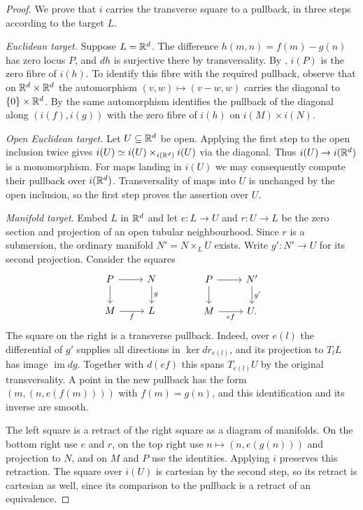 \begin{proof}
  We prove that $i$ carries the transverse square to a pullback, in
  three steps according to the target $L$.

  \emph{Euclidean target.}
  Suppose $L=\mathbb{R}^d$. The difference $h(m,n)=f(m)-g(n)$ has zero locus
  $P$, and $dh$ is surjective there by transversality. By
  , $i(P)$ is the zero fibre of
  $i(h)$. To identify this fibre with the required pullback, observe
  that on $\mathbb{R}^d\times\mathbb{R}^d$ the automorphism $(v,w)\mapsto(v-w,w)$
  carries the diagonal to $\{0\}\times\mathbb{R}^d$. By
   the same automorphism identifies
  the pullback of the diagonal along $(i(f),i(g))$ with the zero fibre
  of $i(h)$ on $i(M)\times i(N)$.

  \emph{Open Euclidean target.}
  Let $U\subseteq\mathbb{R}^d$ be open. Applying the first step to the open
  inclusion twice gives
  $i(U)\simeq i(U)\times_{i(\mathbb{R}^d)}i(U)$ via the diagonal. Thus
  $i(U)\to i(\mathbb{R}^d)$ is a monomorphism. For maps landing in $i(U)$
  we may consequently compute their pullback over $i(\mathbb{R}^d)$.
  Transversality of maps into $U$ is unchanged by the open inclusion,
  so the first step proves the assertion over $U$.

  \emph{Manifold target.}
  Embed $L$ in $\mathbb{R}^d$ and let $e\colon L\to U$ and $r\colon U\to L$
  be the zero section and projection of an open tubular neighbourhood.
  Since $r$ is a submersion, the ordinary manifold $N'=N\times_L U$
  exists. Write $g'\colon N'\to U$ for its second projection. Consider
  the squares
  \[
  \begin{tikzcd}
    P \rar \dar & N \dar["g"] \\
    M \rar["f"'] & L
  \end{tikzcd}
  \qquad\qquad
  \begin{tikzcd}
    P \rar \dar & N' \dar["g'"] \\
    M \rar["ef"'] & U .
  \end{tikzcd}
  \]
  The square on the right is a transverse pullback. Indeed, over
  $e(l)$ the differential of $g'$ supplies all directions in
  $\ker d r_{e(l)}$, and its projection to $T_lL$ has image
  $\operatorname{im}dg$. Together with $d(ef)$ this spans $T_{e(l)}U$
  by the original transversality. A point in the new pullback has
  the form $(m,(n,e(f(m))))$ with $f(m)=g(n)$, and this identification
  and its inverse are smooth.

  The left square is a retract of the right square as a diagram of
  manifolds. On the bottom right use $e$ and $r$, on the top right use
  $n\mapsto(n,e(g(n)))$ and projection to $N$, and on $M$ and $P$ use
  the identities. Applying $i$ preserves this retraction. The square
  over $i(U)$ is cartesian by the second step, so its retract is
  cartesian as well, since its comparison to the pullback is a retract of
  an equivalence.
\end{proof}

